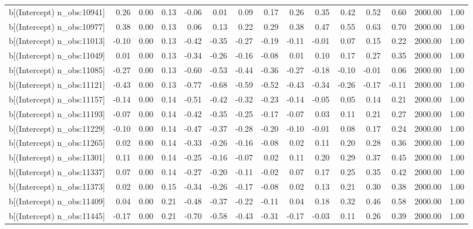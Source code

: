 \begin{table}[ht]
\begin{tabular}{rrrrrrrrrrrrrrr}
  b[(Intercept) n\_obs:10941] & 0.26 & 0.00 & 0.13 & -0.06 & 0.01 & 0.09 & 0.17 & 0.26 & 0.35 & 0.42 & 0.52 & 0.60 & 2000.00 & 1.00 \\ 
  b[(Intercept) n\_obs:10977] & 0.38 & 0.00 & 0.13 & 0.06 & 0.13 & 0.22 & 0.29 & 0.38 & 0.47 & 0.55 & 0.63 & 0.70 & 2000.00 & 1.00 \\ 
  b[(Intercept) n\_obs:11013] & -0.10 & 0.00 & 0.13 & -0.42 & -0.35 & -0.27 & -0.19 & -0.11 & -0.01 & 0.07 & 0.15 & 0.22 & 2000.00 & 1.00 \\ 
  b[(Intercept) n\_obs:11049] & 0.01 & 0.00 & 0.13 & -0.34 & -0.26 & -0.16 & -0.08 & 0.01 & 0.10 & 0.17 & 0.27 & 0.35 & 2000.00 & 1.00 \\ 
  b[(Intercept) n\_obs:11085] & -0.27 & 0.00 & 0.13 & -0.60 & -0.53 & -0.44 & -0.36 & -0.27 & -0.18 & -0.10 & -0.01 & 0.06 & 2000.00 & 1.00 \\ 
  b[(Intercept) n\_obs:11121] & -0.43 & 0.00 & 0.13 & -0.77 & -0.68 & -0.59 & -0.52 & -0.43 & -0.34 & -0.26 & -0.17 & -0.11 & 2000.00 & 1.00 \\ 
  b[(Intercept) n\_obs:11157] & -0.14 & 0.00 & 0.14 & -0.51 & -0.42 & -0.32 & -0.23 & -0.14 & -0.05 & 0.05 & 0.14 & 0.21 & 2000.00 & 1.00 \\ 
  b[(Intercept) n\_obs:11193] & -0.07 & 0.00 & 0.14 & -0.42 & -0.35 & -0.25 & -0.17 & -0.07 & 0.03 & 0.11 & 0.21 & 0.27 & 2000.00 & 1.00 \\ 
  b[(Intercept) n\_obs:11229] & -0.10 & 0.00 & 0.14 & -0.47 & -0.37 & -0.28 & -0.20 & -0.10 & -0.01 & 0.08 & 0.17 & 0.24 & 2000.00 & 1.00 \\ 
  b[(Intercept) n\_obs:11265] & 0.02 & 0.00 & 0.14 & -0.33 & -0.26 & -0.16 & -0.08 & 0.02 & 0.11 & 0.20 & 0.28 & 0.36 & 2000.00 & 1.00 \\ 
  b[(Intercept) n\_obs:11301] & 0.11 & 0.00 & 0.14 & -0.25 & -0.16 & -0.07 & 0.02 & 0.11 & 0.20 & 0.29 & 0.37 & 0.45 & 2000.00 & 1.00 \\ 
  b[(Intercept) n\_obs:11337] & 0.07 & 0.00 & 0.14 & -0.27 & -0.20 & -0.11 & -0.02 & 0.07 & 0.17 & 0.25 & 0.35 & 0.42 & 2000.00 & 1.00 \\ 
  b[(Intercept) n\_obs:11373] & 0.02 & 0.00 & 0.15 & -0.34 & -0.26 & -0.17 & -0.08 & 0.02 & 0.13 & 0.21 & 0.30 & 0.38 & 2000.00 & 1.00 \\ 
  b[(Intercept) n\_obs:11409] & 0.04 & 0.00 & 0.21 & -0.48 & -0.37 & -0.22 & -0.11 & 0.04 & 0.18 & 0.32 & 0.46 & 0.58 & 2000.00 & 1.00 \\ 
  b[(Intercept) n\_obs:11445] & -0.17 & 0.00 & 0.21 & -0.70 & -0.58 & -0.43 & -0.31 & -0.17 & -0.03 & 0.11 & 0.26 & 0.39 & 2000.00 & 1.00 \\ 

\end{tabular}
\end{table}
